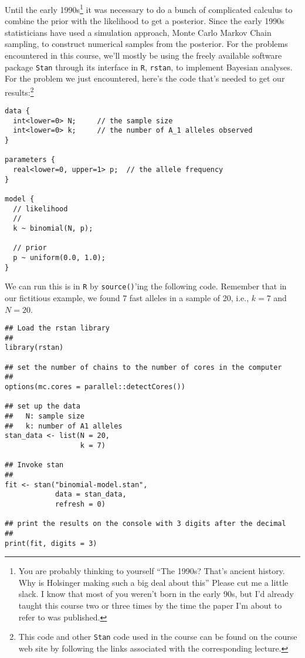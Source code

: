 Until the early 1990s\footnote{You are probably thinking to yourself
  ``The 1990s? That's ancient history. Why is Holsinger making such a
  big deal about this'' Please cut me a little slack. I know that most
  of you weren't born in the early 90s, but I'd already taught this
  course two or three times by the time the paper I'm about to refer
  to was published.} it was necessary to do a bunch of complicated
calculus to combine the prior with the likelihood to get a
posterior. Since the early 1990s statisticians have used a simulation
approach, Monte Carlo Markov Chain sampling, to construct numerical
samples from the posterior. For the problems encountered in this
course, we'll mostly be using the freely available software package
{\tt Stan} through its interface in {\tt R}, {\tt rstan}, to implement
Bayesian analyses. For the problem we just encountered, here's the
code that's needed to get our results:\footnote{This code and other
  {\tt Stan} code used in the course can be found on the course web
  site by following the links associated with the corresponding
  lecture.}
\begin{verbatim}
data {
  int<lower=0> N;     // the sample size
  int<lower=0> k;     // the number of A_1 alleles observed
}

parameters {
  real<lower=0, upper=1> p;  // the allele frequency
}

model {
  // likelihood
  //
  k ~ binomial(N, p);

  // prior
  p ~ uniform(0.0, 1.0);
}
\end{verbatim}
We can run this is in {\tt R} by {\tt source()}'ing the following
code. Remember that in our fictitious example, we found 7 fast alleles
in a sample of 20, i.e., $k=7$ and $N=20$.
\begin{verbatim}
## Load the rstan library
##
library(rstan)

## set the number of chains to the number of cores in the computer
##
options(mc.cores = parallel::detectCores())

## set up the data
##   N: sample size
##   k: number of A1 alleles
stan_data <- list(N = 20,
                  k = 7)

## Invoke stan
##
fit <- stan("binomial-model.stan",
            data = stan_data,
            refresh = 0)

## print the results on the console with 3 digits after the decimal
##
print(fit, digits = 3)
\end{verbatim}

